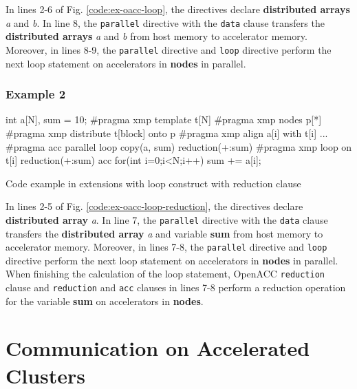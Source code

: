 In lines 2-6 of Fig. \ref{code:ex-oacc-loop},
the directives declare {\bf distributed arrays} {\it a} and {\it b}.
In line 8,
the {\tt parallel} directive with the {\tt data} clause transfers the {\bf distributed arrays} {\it a} and {\it b} from host memory to accelerator memory.
Moreover,
in lines 8-9,
the {\tt parallel} directive and {\XMP} {\tt loop} directive perform the next loop statement on accelerators in {\bf nodes} in parallel.

\subsubsection*{Example 2}
\begin{myfigure}
\begin{center}
\begin{XACCCexampleL}
int a[N], sum = 10;
#pragma xmp template t[N]
#pragma xmp nodes p[*]
#pragma xmp distribute t[block] onto p
#pragma xmp align a[i] with t[i]
...
#pragma acc parallel loop copy(a, sum) reduction(+:sum)
#pragma xmp loop on t[i] reduction(+:sum) acc
for(int i=0;i<N;i++){
  sum += a[i];
}
\end{XACCCexampleL}
\end{center}
\caption{Code example in {\XMP} extensions with {\OACC} loop construct with reduction clause}\label{code:ex-oacc-loop-reduction}
\end{myfigure}

In lines 2-5 of Fig. \ref{code:ex-oacc-loop-reduction},
the directives declare {\bf distributed array} {\it a}.
In line 7,
the {\tt parallel} directive with the {\tt data} clause transfers the {\bf distributed array} {\it a} and variable {\bf sum} from host memory to accelerator memory.
Moreover,
in lines 7-8,
the {\tt parallel} directive and {\XMP} {\tt loop} directive perform the next loop statement on accelerators in {\bf nodes} in parallel.
When finishing the calculation of the loop statement,
OpenACC {\tt reduction} clause and {\XMP} {\tt reduction} and {\tt acc} clauses in lines 7-8 perform a reduction operation for the variable {\bf sum} on accelerators in {\bf nodes}.

\section{Communication on Accelerated Clusters}
